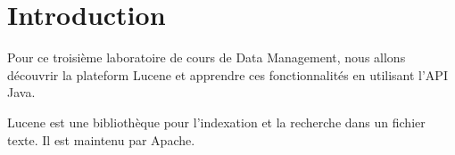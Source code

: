 \chapter*{Introduction}

Pour ce troisième laboratoire de cours de Data Management, nous allons découvrir la plateform Lucene et apprendre ces fonctionnalités en utilisant l'API Java.

Lucene est une bibliothèque pour l'indexation et la recherche dans un fichier texte. Il est maintenu par Apache.

